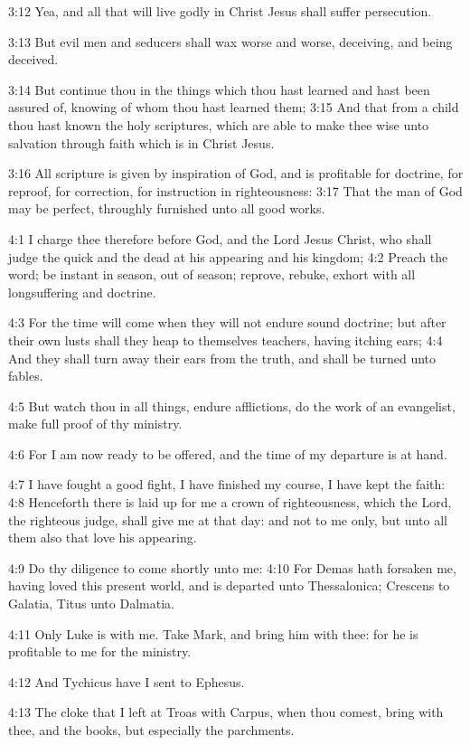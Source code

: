 3:12 Yea, and all that will live godly in Christ Jesus shall suffer
persecution.

3:13 But evil men and seducers shall wax worse and worse, deceiving,
and being deceived.

3:14 But continue thou in the things which thou hast learned and hast
been assured of, knowing of whom thou hast learned them; 3:15 And that
from a child thou hast known the holy scriptures, which are able to
make thee wise unto salvation through faith which is in Christ Jesus.

3:16 All scripture is given by inspiration of God, and is profitable
for doctrine, for reproof, for correction, for instruction in
righteousness: 3:17 That the man of God may be perfect, throughly
furnished unto all good works.

4:1 I charge thee therefore before God, and the Lord Jesus Christ, who
shall judge the quick and the dead at his appearing and his kingdom;
4:2 Preach the word; be instant in season, out of season; reprove,
rebuke, exhort with all longsuffering and doctrine.

4:3 For the time will come when they will not endure sound doctrine;
but after their own lusts shall they heap to themselves teachers,
having itching ears; 4:4 And they shall turn away their ears from the
truth, and shall be turned unto fables.

4:5 But watch thou in all things, endure afflictions, do the work of
an evangelist, make full proof of thy ministry.

4:6 For I am now ready to be offered, and the time of my departure is
at hand.

4:7 I have fought a good fight, I have finished my course, I have kept
the faith: 4:8 Henceforth there is laid up for me a crown of
righteousness, which the Lord, the righteous judge, shall give me at
that day: and not to me only, but unto all them also that love his
appearing.

4:9 Do thy diligence to come shortly unto me: 4:10 For Demas hath
forsaken me, having loved this present world, and is departed unto
Thessalonica; Crescens to Galatia, Titus unto Dalmatia.

4:11 Only Luke is with me. Take Mark, and bring him with thee: for he
is profitable to me for the ministry.

4:12 And Tychicus have I sent to Ephesus.

4:13 The cloke that I left at Troas with Carpus, when thou comest,
bring with thee, and the books, but especially the parchments.

